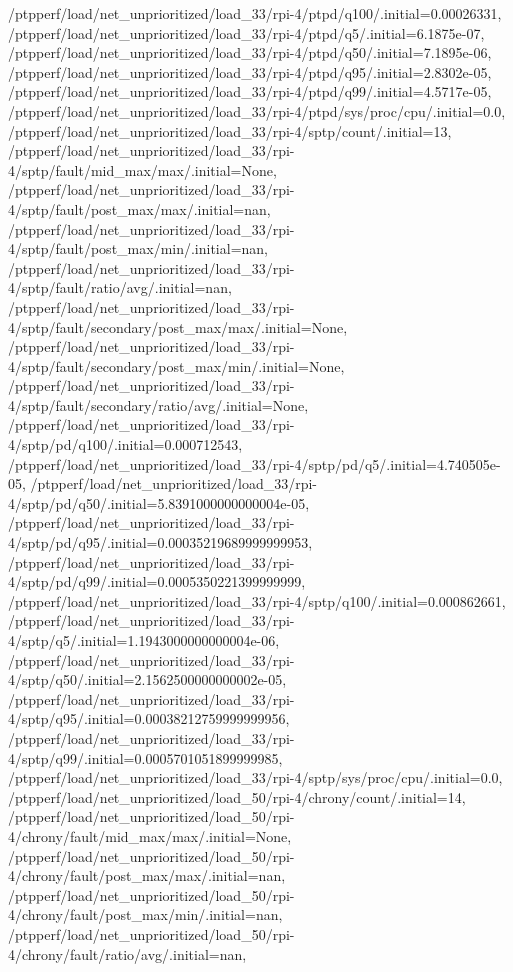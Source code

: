 {    /ptpperf/load/net_unprioritized/load_33/rpi-4/ptpd/q100/.initial=0.00026331,
    /ptpperf/load/net_unprioritized/load_33/rpi-4/ptpd/q5/.initial=6.1875e-07,
    /ptpperf/load/net_unprioritized/load_33/rpi-4/ptpd/q50/.initial=7.1895e-06,
    /ptpperf/load/net_unprioritized/load_33/rpi-4/ptpd/q95/.initial=2.8302e-05,
    /ptpperf/load/net_unprioritized/load_33/rpi-4/ptpd/q99/.initial=4.5717e-05,
    /ptpperf/load/net_unprioritized/load_33/rpi-4/ptpd/sys/proc/cpu/.initial=0.0,
    /ptpperf/load/net_unprioritized/load_33/rpi-4/sptp/count/.initial=13,
    /ptpperf/load/net_unprioritized/load_33/rpi-4/sptp/fault/mid_max/max/.initial=None,
    /ptpperf/load/net_unprioritized/load_33/rpi-4/sptp/fault/post_max/max/.initial=nan,
    /ptpperf/load/net_unprioritized/load_33/rpi-4/sptp/fault/post_max/min/.initial=nan,
    /ptpperf/load/net_unprioritized/load_33/rpi-4/sptp/fault/ratio/avg/.initial=nan,
    /ptpperf/load/net_unprioritized/load_33/rpi-4/sptp/fault/secondary/post_max/max/.initial=None,
    /ptpperf/load/net_unprioritized/load_33/rpi-4/sptp/fault/secondary/post_max/min/.initial=None,
    /ptpperf/load/net_unprioritized/load_33/rpi-4/sptp/fault/secondary/ratio/avg/.initial=None,
    /ptpperf/load/net_unprioritized/load_33/rpi-4/sptp/pd/q100/.initial=0.000712543,
    /ptpperf/load/net_unprioritized/load_33/rpi-4/sptp/pd/q5/.initial=4.740505e-05,
    /ptpperf/load/net_unprioritized/load_33/rpi-4/sptp/pd/q50/.initial=5.8391000000000004e-05,
    /ptpperf/load/net_unprioritized/load_33/rpi-4/sptp/pd/q95/.initial=0.00035219689999999953,
    /ptpperf/load/net_unprioritized/load_33/rpi-4/sptp/pd/q99/.initial=0.0005350221399999999,
    /ptpperf/load/net_unprioritized/load_33/rpi-4/sptp/q100/.initial=0.000862661,
    /ptpperf/load/net_unprioritized/load_33/rpi-4/sptp/q5/.initial=1.1943000000000004e-06,
    /ptpperf/load/net_unprioritized/load_33/rpi-4/sptp/q50/.initial=2.1562500000000002e-05,
    /ptpperf/load/net_unprioritized/load_33/rpi-4/sptp/q95/.initial=0.00038212759999999956,
    /ptpperf/load/net_unprioritized/load_33/rpi-4/sptp/q99/.initial=0.0005701051899999985,
    /ptpperf/load/net_unprioritized/load_33/rpi-4/sptp/sys/proc/cpu/.initial=0.0,
    /ptpperf/load/net_unprioritized/load_50/rpi-4/chrony/count/.initial=14,
    /ptpperf/load/net_unprioritized/load_50/rpi-4/chrony/fault/mid_max/max/.initial=None,
    /ptpperf/load/net_unprioritized/load_50/rpi-4/chrony/fault/post_max/max/.initial=nan,
    /ptpperf/load/net_unprioritized/load_50/rpi-4/chrony/fault/post_max/min/.initial=nan,
    /ptpperf/load/net_unprioritized/load_50/rpi-4/chrony/fault/ratio/avg/.initial=nan,
}
